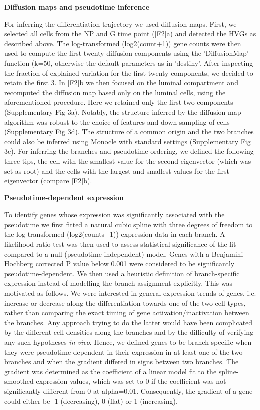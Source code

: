 \documentclass[titlepage, 12pt, oneside]{amsart}
\begin{document}
\textbf{Diffusion maps and pseudotime inference}

For inferring the differentiation trajectory we used diffusion maps.
First, we selected all cells from the NP and G time point (\autoref{F2}a) and detected the HVGs as described above.
The log-transformed (log2(count+1)) gene counts were then used to compute the first twenty diffusion components using the 'DiffusionMap' function (k=50, otherwise the default parameters as in 'destiny'\autocite{Angerer2016}.
After inspecting the fraction of explained variation for the first twenty components, we decided to retain the first 3.
In \autoref{F2}b we then focused on the luminal compartment and recomputed the diffusion map based only on the luminal cells, using the aforementioned procedure.
Here we retained only the first two components (Supplementary Fig 3a).
Notably, the structure inferred by the diffusion map algorithm was robust to the choice of features and down-sampling of cells (Supplementary Fig 3d).
The structure of a common origin and the two branches could also be inferred using Monocle with standard settings\autocite{Trapnell2014} (Supplementary Fig 3c).
For inferring the branches and pseudotime ordering, we defined the following three tips, the cell with the smallest value for the second eigenvector (which was set as root) and the cells with the largest and smallest values for the first eigenvector (compare \autoref{F2}b).  

\textbf{Pseudotime-dependent expression}

To identify genes whose expression was significantly associated with the pseudotime we first fitted a natural cubic spline with three degrees of freedom to the log-transformed (log2(counts+1)) expression data in each branch.
A likelihood ratio test was then used to assess statistical significance of the fit compared to a null (pseudotime-independent) model.
Genes with a Benjamini-Hochberg corrected P value below 0.001 were considered to be significantly pseudotime-dependent.
We then used a heuristic definition of branch-specific expression instead of modelling the branch assignment explicitly.
This was motivated as follows. We were interested in general expression trends of genes, i.e. increase or decrease along the differentiation towards one of the two cell types, rather than comparing the exact timing of gene activation/inactivation between the branches.
Any approach trying to do the latter would have been complicated by the different cell densities along the branches and by the difficulty of verifying any such hypotheses \textit{in vivo}.
Hence, we defined genes to be branch-specific when they were pseudotime-dependent in their expression in at least one of the two branches and when the gradient differed in signs between two branches.
The gradient was determined as the coefficient of a linear model fit to the spline-smoothed expression values, which was set to 0 if the coefficient was not significantly different from 0 at alpha=0.01.
Consequently, the gradient of a gene could either be -1 (decreasing), 0 (flat) or 1 (increasing).
\end{document}

